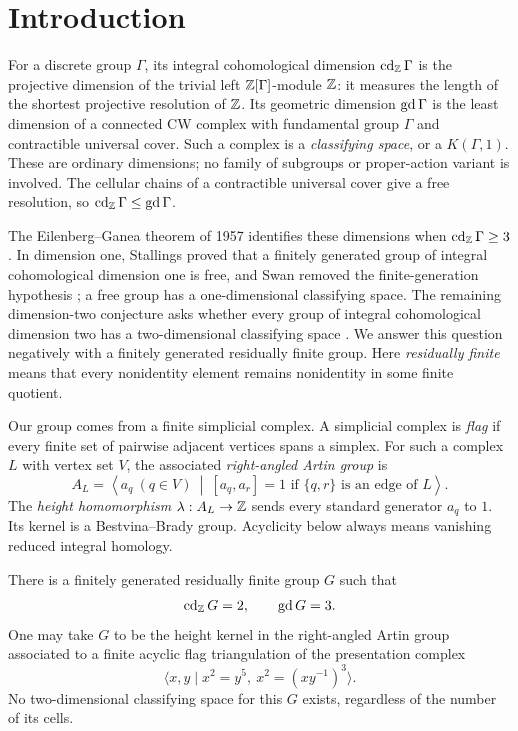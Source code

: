 \section{Introduction}
\label{sec:introduction}

For a discrete group $\Gamma$, its integral cohomological dimension $\operatorname{cd}_{\mathbb Z}\Gamma$ is the projective dimension of the trivial left $\mathbb Z[\Gamma]$-module $\mathbb Z$: it measures the length of the shortest projective resolution of $\mathbb Z$. Its geometric dimension $\operatorname{gd}\Gamma$ is the least dimension of a connected CW complex with fundamental group $\Gamma$ and contractible universal cover. Such a complex is a \emph{classifying space}, or a $K(\Gamma,1)$. These are ordinary dimensions; no family of subgroups or proper-action variant is involved. The cellular chains of a contractible universal cover give a free resolution, so $\operatorname{cd}_{\mathbb Z}\Gamma\le\operatorname{gd}\Gamma$.

The Eilenberg--Ganea theorem of 1957 identifies these dimensions when $\operatorname{cd}_{\mathbb Z}\Gamma\ge3$. In dimension one, Stallings proved that a finitely generated group of integral cohomological dimension one is free, and Swan removed the finite-generation hypothesis \cite{Stallings1968,Swan1969}; a free group has a one-dimensional classifying space. The remaining dimension-two conjecture asks whether every group of integral cohomological dimension two has a two-dimensional classifying space \cite{EG1957}. We answer this question negatively with a finitely generated residually finite group. Here \emph{residually finite} means that every nonidentity element remains nonidentity in some finite quotient.

Our group comes from a finite simplicial complex. A simplicial complex is \emph{flag} if every finite set of pairwise adjacent vertices spans a simplex. For such a complex $L$ with vertex set $V$, the associated \emph{right-angled Artin group} is
\[
 A_L=\left\langle a_q\ (q\in V)\ \middle|\
 [a_q,a_r]=1\text{ if }\{q,r\}\text{ is an edge of }L\right\rangle.
\]
The \emph{height homomorphism} $\lambda:A_L\to\mathbb Z$ sends every standard generator $a_q$ to $1$. Its kernel is a Bestvina--Brady group. Acyclicity below always means vanishing reduced integral homology.

\begin{theorem}
\label{thm:main}
There is a finitely generated residually finite group $G$ such that
\[
 \operatorname{cd}_{\mathbb Z} G=2,\qquad \operatorname{gd} G=3.
\]
One may take $G$ to be the height kernel in the right-angled Artin group associated to a finite acyclic flag triangulation of the presentation complex
\begin{equation}
\label{eq:seed-presentation-intro}
 \langle x,y\mid x^2=y^5,\ x^2=(xy^{-1})^3\rangle.
\end{equation}
No two-dimensional classifying space for this $G$ exists, regardless of the number of its cells.
\end{theorem}

